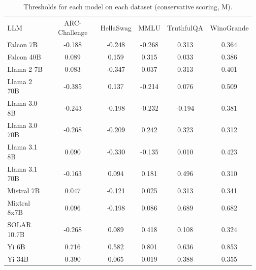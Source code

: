 \begin{table}[h]
\caption{Thresholds for each model on each dataset (conservative scoring, M). }
\label{tab:thresholds_prob_entropy_k20_w2}
\centering
\begin{tabular}{l S[table-format=3.1] S[table-format=3.1] S[table-format=3.1] S[table-format=3.1] S[table-format=3.1]}
\toprule
LLM & ARC-Challenge & HellaSwag & MMLU & TruthfulQA & WinoGrande \\ 
\cmidrule(lr){1-1} \cmidrule(lr){2-2} \cmidrule(lr){3-3} \cmidrule(lr){4-4} \cmidrule(lr){5-5} \cmidrule(lr){6-6}
Falcon 7B & -0.188 & -0.248 & -0.268 & 0.313 & 0.364\\
Falcon 40B & 0.089 & 0.159 & 0.315 & 0.033 & 0.386\\
Llama 2 7B & 0.083 & -0.347 & 0.037 & 0.313 & 0.401\\
Llama 2 70B & -0.385 & 0.137 & -0.214 & 0.076 & 0.509\\
Llama 3.0 8B & -0.243 & -0.198 & -0.232 & -0.194 & 0.381\\
Llama 3.0 70B & -0.268 & -0.209 & 0.242 & 0.323 & 0.312\\
Llama 3.1 8B & 0.090 & -0.330 & -0.135 & 0.010 & 0.423\\
Llama 3.1 70B & -0.163 & 0.094 & 0.181 & 0.496 & 0.310\\
Mistral 7B & 0.047 & -0.121 & 0.025 & 0.313 & 0.341\\
Mixtral 8x7B & 0.096 & -0.198 & 0.086 & 0.689 & 0.682\\
SOLAR 10.7B & -0.268 & 0.089 & 0.418 & 0.108 & 0.324\\
Yi 6B & 0.716 & 0.582 & 0.801 & 0.636 & 0.853\\
Yi 34B & 0.390 & 0.065 & 0.019 & 0.388 & 0.355\\
\bottomrule
\end{tabular}
\end{table}
